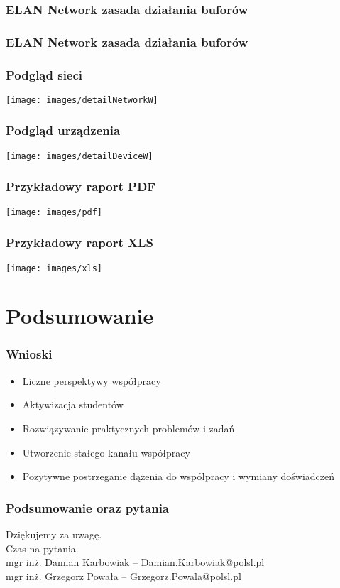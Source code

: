 \documentclass[ucs]{beamer}
\begin{document}
\begin{frame}
\frametitle{ELAN Network zasada działania buforów}

\end{frame}

\begin{frame}
\frametitle{ELAN Network zasada działania buforów}

\end{frame}

\begin{frame}
\frametitle{Podgląd sieci}
\texttt{[image: images/detailNetworkW]}
\end{frame}

\begin{frame}
\frametitle{Podgląd urządzenia}
\texttt{[image: images/detailDeviceW]}
\end{frame}

\begin{frame}
\frametitle{Przykładowy raport PDF}
\texttt{[image: images/pdf]}
\end{frame}

\begin{frame}
\frametitle{Przykładowy raport XLS}
\texttt{[image: images/xls]}
\end{frame}

\section{Podsumowanie}
\begin{frame}
\frametitle{Wnioski}
\begin{itemize}
\setlength{\itemsep}{5pt}
\setlength{\parskip}{5pt}
\setlength{\parsep}{5pt}
\item Liczne perspektywy współpracy
\item Aktywizacja studentów
\item Rozwiązywanie praktycznych problemów i zadań
\item Utworzenie stałego kanału współpracy 
\item Pozytywne postrzeganie dążenia do współpracy i wymiany doświadczeń
\end{itemize}
\end{frame}

\begin{frame}
\frametitle{Podsumowanie oraz pytania}
Dziękujemy za uwagę.
\\\vspace{2cm}
Czas na pytania.
\\\vspace{2cm}
mgr inż. Damian Karbowiak -- Damian.Karbowiak@polsl.pl\\
mgr inż. Grzegorz Powała -- Grzegorz.Powala@polsl.pl
\end{frame}
\end{document}
